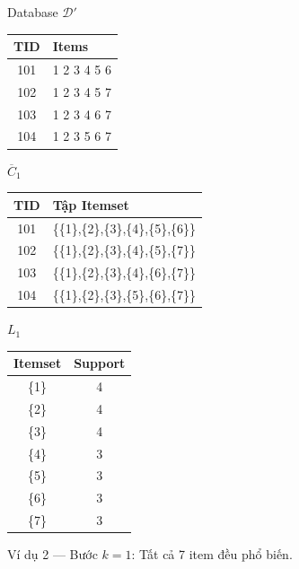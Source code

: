 \documentclass[12pt]{article}
\begin{document}
\begin{figure}[htbp]
    \centering
    \renewcommand{\arraystretch}{1.2}

    \begin{minipage}[t]{0.22\textwidth}
        \centering
        Database $\mathcal{D}'$\\[4pt]
        \begin{tabular}{|c|l|}
        \hline
        TID & Items \\ \hline
        101 & 1 2 3 4 5 6 \\
        102 & 1 2 3 4 5 7 \\
        103 & 1 2 3 4 6 7 \\
        104 & 1 2 3 5 6 7 \\ \hline
        \end{tabular}
    \end{minipage}
    \hfill
    \begin{minipage}[t]{0.45\textwidth}
        \centering
        $\overline{C}_1$\\[4pt]
        \begin{tabular}{|c|l|}
        \hline
        TID & Tập Itemset \\ \hline
        101 & \{\{1\},\{2\},\{3\},\{4\},\{5\},\{6\}\} \\
        102 & \{\{1\},\{2\},\{3\},\{4\},\{5\},\{7\}\} \\
        103 & \{\{1\},\{2\},\{3\},\{4\},\{6\},\{7\}\} \\
        104 & \{\{1\},\{2\},\{3\},\{5\},\{6\},\{7\}\} \\ \hline
        \end{tabular}
    \end{minipage}
    \hfill
    \begin{minipage}[t]{0.25\textwidth}
        \centering
        $L_1$\\[4pt]
        \begin{tabular}{|c|c|}
        \hline
        Itemset & Support \\ \hline
        \{1\} & 4 \\
        \{2\} & 4 \\
        \{3\} & 4 \\
        \{4\} & 3 \\
        \{5\} & 3 \\
        \{6\} & 3 \\
        \{7\} & 3 \\ \hline
        \end{tabular}
    \end{minipage}

    \caption{Ví dụ 2 --- Bước $k=1$: Tất cả 7 item đều phổ biến.}
    \label{fig:example2-k1}
\end{figure}
\end{document}
